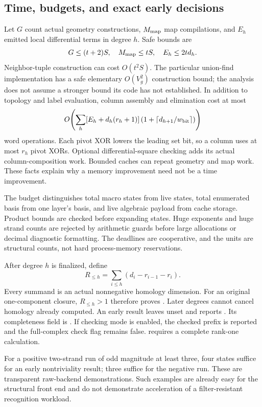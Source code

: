 \subsection{Time, budgets, and exact early decisions}

Let \(G\) count actual geometry constructions, \(M_{\rm map}\) map
compilations, and \(E_h\) emitted local differential terms in degree
\(h\). Safe bounds are
\[
G\le(t+2)S,\quad M_{\rm map}\le tS,\quad E_h\le2td_h.
\]
Neighbor-tuple construction can cost \(O(t^2S)\). The particular
union-find implementation has a safe elementary \(O(V_g^2)\) construction
bound; the analysis does not assume a stronger bound its code has not
established. In addition to topology and label evaluation, column
assembly and elimination cost at most
\[
O\!\left(\sum_h[E_h+d_h(r_h+1)]
\left(1+\left\lceil d_{h+1}/w_{\rm bit}\right\rceil\right)\right)
\]
word operations. Each pivot XOR lowers the leading set bit, so a column
uses at most \(r_h\) pivot XORs. Optional differential-square checking
adds its actual column-composition work.
Bounded caches can repeat geometry and map work. These facts explain
why a memory improvement need not be a time improvement.

The budget distinguishes total macro states from live states, total
enumerated basis from one layer's basis, and live algebraic payload from
cache storage. Product bounds are checked before expanding states.
Huge exponents and huge strand counts are rejected by arithmetic
guards before large allocations or decimal diagnostic formatting.
The deadlines are cooperative, and the units are structural counts,
not hard process-memory reservations.

After degree \(h\) is finalized, define
\[
R_{\le h}=\sum_{i\le h}(d_i-r_{i-1}-r_i).
\]
Every summand is an actual nonnegative homology dimension. For an
original one-component closure, \(R_{\le h}>1\) therefore proves
. Later degrees cannot cancel homology already computed.
An early result leaves  unset and reports
.
Its completeness field is .
If checking mode is enabled, the checked
prefix is reported and the full-complex check flag remains false.
 requires a complete rank-one calculation.

For a positive two-strand run of odd magnitude at least three, four
states suffice for an early
nontriviality result; three suffice for the negative run. These are
transparent raw-backend demonstrations. Such examples are already
easy for the structural front end and do not demonstrate acceleration
of a filter-resistant recognition workload.
